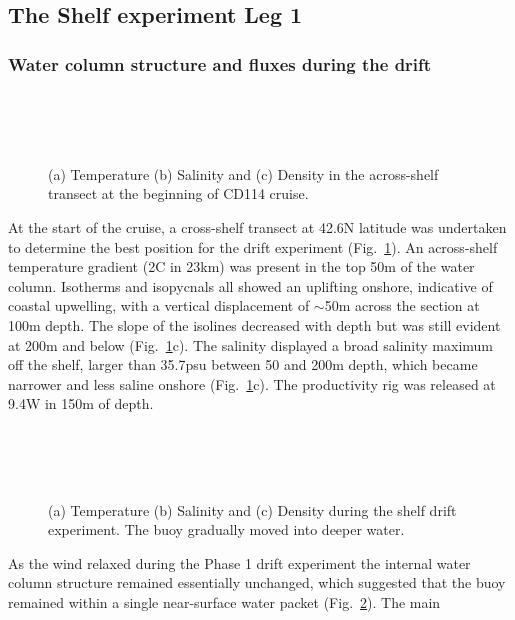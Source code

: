 \subsection{The Shelf experiment Leg 1}
\subsubsection{Water column structure and fluxes during the drift}
\begin{figure}
\centering %
\\
\\
\\
\caption{(a) Temperature (b) Salinity and (c) Density in the
across-shelf transect at the beginning of CD114 cruise.}
\label{fig:cd114_shelftran}%
\end{figure}
At the start of the cruise, a cross-shelf transect at 42.6\deg N
latitude was undertaken to determine the best position for the
drift experiment (Fig.~\ref{fig:cd114_shelftran}). An across-shelf
temperature gradient (2\deg C in 23km) was present in the top 50m
of the water column. Isotherms and isopycnals all showed an
uplifting onshore, indicative of coastal upwelling, with a
vertical displacement of $\sim$50m across the section at 100m
depth. The slope of the isolines decreased with depth but was
still evident at 200m and below (Fig.~\ref{fig:cd114_shelftran}c).
The salinity displayed a broad salinity maximum off the shelf,
larger than 35.7psu between 50 and 200m depth, which became
narrower and less saline onshore
(Fig.~\ref{fig:cd114_shelftran}c). The productivity rig was
released at 9.4\deg W in 150m of depth.
\begin{figure}[th]
\centering %
\\
\\
\\
\caption{(a) Temperature (b) Salinity and (c) Density during the
shelf drift experiment. The buoy gradually moved into
deeper water.}%
\label{fig:cd114_drifta}%
\end{figure}
As the wind relaxed during the Phase 1 drift experiment the
internal water column structure remained essentially unchanged,
which suggested that the buoy remained within a single
near-surface water packet (Fig.~\ref{fig:cd114_drifta}). The main
